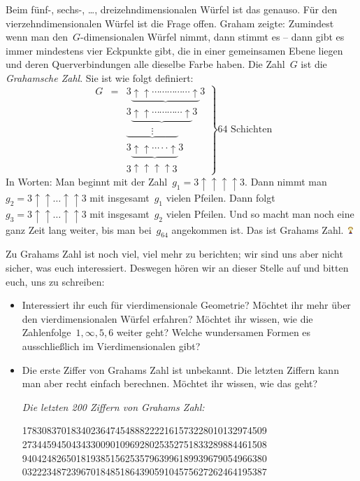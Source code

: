 \documentclass{../../zirkelblatt1718}
\theoremstyle{definition}
\theoremstyle{plain}
\theoremstyle{remark}
\newcommand{\happy}{\includegraphics[height=0.7em]{happy}\xspace}
\begin{document}
Beim fünf-, sechs-, \ldots, dreizehndimensionalen Würfel ist das genauso. Für
den vierzehndimensionalen Würfel ist die Frage offen. Graham zeigte: Zumindest
wenn man den~$G$-dimensionalen Würfel nimmt, dann stimmt es -- dann gibt es
immer mindestens vier Eckpunkte gibt, die in einer gemeinsamen Ebene liegen und
deren Querverbindungen alle dieselbe Farbe haben. Die Zahl~$G$ ist die
\emph{Grahamsche Zahl}. Sie ist wie folgt definiert:
\[
\left.
 \begin{matrix}
  G &=&3\underbrace{\uparrow \uparrow \cdots\cdots\cdots\cdots\cdots \uparrow}3 \\
    & &3\underbrace{\uparrow \uparrow \cdots\cdots\cdots\cdots \uparrow}3 \\
    & &\underbrace{\qquad\;\; \vdots \qquad\;\;} \\
    & &3\underbrace{\uparrow \uparrow \cdots\cdot\cdot \uparrow}3 \\
    & &3\uparrow \uparrow \uparrow \uparrow3
 \end{matrix}
\right \} \text{64 Schichten}
\]
In Worten: Man beginnt mit der Zahl~$g_1 = 3\uparrow \uparrow \uparrow \uparrow3$.
Dann nimmt man~$g_2 = 3 \uparrow \uparrow \ldots \uparrow \uparrow 3$ mit
insgesamt~$g_1$ vielen Pfeilen. Dann folgt~$g_3 = 3 \uparrow \uparrow \ldots
\uparrow \uparrow 3$ mit insgesamt~$g_2$ vielen Pfeilen. Und so macht man noch
eine ganz Zeit lang weiter, bis man bei~$g_{64}$ angekommen ist. Das ist
Grahams Zahl.~\happy

Zu Grahams Zahl ist noch viel, viel mehr zu berichten; wir sind uns aber nicht
sicher, was euch interessiert. Deswegen hören wir an dieser Stelle auf und
bitten euch, uns zu schreiben:

\begin{itemize}
  \item Interessiert ihr euch für vierdimensionale Geometrie? Möchtet ihr mehr
  über den vierdimensionalen Würfel erfahren? Möchtet ihr wissen, wie die
  Zahlenfolge~$1, \infty, 5, 6$ weiter geht? Welche wundersamen Formen es
  ausschließlich im Vierdimensionalen gibt?
  \item Die erste Ziffer von Grahams Zahl ist unbekannt. Die letzten Ziffern
  kann man aber recht einfach berechnen. Möchtet ihr wissen, wie das geht?
\begin{center}

\emph{Die letzten 200 Ziffern von Grahams Zahl:}

17830837018340236474548882222161573228010132974509 \\
27344594504343300901096928025352751833289884461508 \\
94042482650181938515625357963996189939679054966380 \\
03222348723967018485186439059104575627262464195387
\par
\end{center}
\end{itemize}
\end{document}
